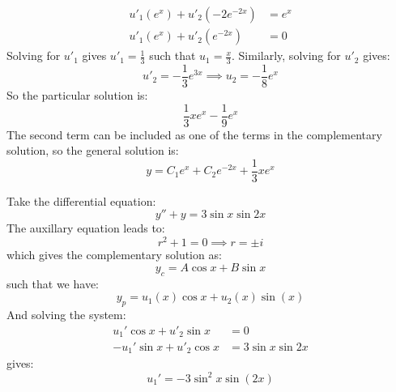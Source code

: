 \begin{itemize}
\begin{example}
\begin{align}
            u'_1(e^x)+u'_2(-2e^{-2x}) &= e^x \\
            u'_1(e^x)+u'_2(e^{-2x}) &= 0 
        \end{align}
        Solving for $u'_1$ gives $u'_1 = \frac{1}{3}$ such that $u_1=\frac{x}{3}$. Similarly, solving for $u'_2$ gives:
        \begin{equation}
            u'_2 = -\frac{1}{3}e^{3x} \implies u_2=-\frac{1}{8}e^x
            \label{eq:}
        \end{equation}
        So the particular solution is:
        \begin{equation}
            \frac{1}{3}xe^x-\frac{1}{9}e^x
            \label{eq:}
        \end{equation}
        The second term can be included as one of the terms in the complementary solution, so the general solution is:
        \begin{equation}
            y=C_1e^{x}+C_2e^{-2x}+\frac{1}{3}xe^x
            \label{eq:}
        \end{equation}
    \end{example}
    \begin{example}
        Take the differential equation:
        \begin{equation}
            y''+y= 3\sin x\sin 2x
            \label{eq:}
        \end{equation}
        The auxillary equation leads to:
        \begin{equation}
            r^2+1=0\implies r = \pm i
            \label{eq:}
        \end{equation}
        which gives the complementary solution as:
        \begin{equation}
            y_c=A\cos x+B\sin x
            \label{eq:}
        \end{equation}
        such that we have:
        \begin{equation}
            y_p=u_1(x)\cos x+u_2(x)\sin(x)
            \label{eq:}
        \end{equation}
        And solving the system:
        \begin{align}
            u_1'\cos x + u'_2\sin x &= 0 \\ 
            -u_1'\sin x + u'_2\cos x &= 3\sin x\sin 2x
        \end{align}
        gives:
        \begin{equation}
            u_1' = -3\sin^2x\sin(2x)
            \label{eq:}
        \end{equation}

\end{example}
\end{itemize}
